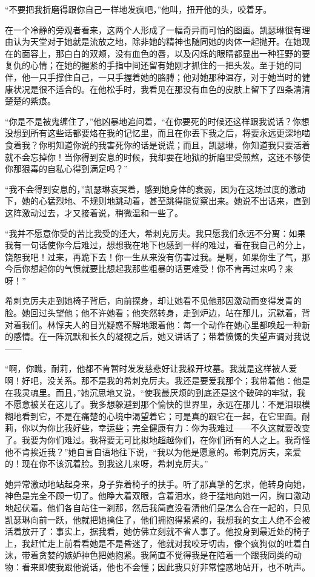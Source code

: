 \par “不要把我折磨得跟你自己一样地发疯吧，”他叫，扭开他的头，咬着牙。
\par 在一个冷静的旁观者看来，这两个人形成了一幅奇异而可怕的图画。凯瑟琳很有理由认为天堂对于她就是流放之地，除非她的精神也随同她的肉体一起抛开。在她现在的面容上，那白白的双颊，没有血色的唇，以及闪烁的眼睛都显出一种狂野的要复仇的心情；在她的握紧的手指中间还留有她刚才抓住的一把头发。至于她的同伴，他一只手撑住自己，一只手握着她的胳膊；他对她那种温存，对于她当时的健康状况是很不适合的。在他松手时，我看见在那没有血色的皮肤上留下了四条清清楚楚的紫痕。
\par “你是不是被鬼缠住了，”他凶暴地追问着，“在你要死的时候还这样跟我说话？你想没想到所有这些话都要烙在我的记忆里，而且在你丢下我之后，将要永远更深地啮食着我？你明知道你说的我害死你的话是说谎；而且，凯瑟琳，你知道我只要活着就不会忘掉你！当你得到安息的时候，我却要在地狱的折磨里受煎熬，这还不够使你那狠毒的自私心得到满足吗？”
\par “我不会得到安息的，”凯瑟琳哀哭着，感到她身体的衰弱，因为在这场过度的激动下，她的心猛烈地、不规则地跳动着，甚至跳得能觉察出来。她说不出话来，直到这阵激动过去，才又接着说，稍微温和一些了。
\par “我并不愿意你受的苦比我受的还大，希刺克厉夫。我只愿我们永远不分离：如果我有一句话使你今后难过，想想我在地下也感到一样的难过，看在我自己的分上，饶恕我吧！过来，再跪下去！你一生从来没有伤害过我。是啊，如果你生了气，那今后你想起你的气愤就要比想起我那些粗暴的话更难受！你不肯再过来吗？来呀！”
\par 希刺克厉夫走到她椅子背后，向前探身，却让她看不见他那因激动而变得发青的脸。她回过头望他；他不许她看；他突然转身，走到炉边，站在那儿，沉默着，背对着我们。林惇夫人的目光疑惑不解地跟着他：每一个动作在她心里都唤起一种新的感情。在一阵沉默和长久的凝视之后，她又讲话了；带着愤慨的失望声调对我说——
\par “啊，你瞧，耐莉，他都不肯暂时发发慈悲好让我躲开坟墓。我就是这样被人爱啊！好吧，没关系。那不是我的希刺克厉夫。我还是要爱我那个；我带着他：他是在我灵魂里。而且，”她沉思地又说，“使我最厌烦的到底还是这个破碎的牢狱，我不愿意被关在这儿了。我多想躲避到那个愉快的世界里，永远在那儿：不是泪眼模糊地看到它，不是在痛楚的心境中渴望着它；可是真的跟它在一起，在它里面。耐莉，你以为你比我好些，幸运些；完全健康有力：你为我难过——不久这就要改变了。我要为你们难过。我将要无可比拟地超越你们，在你们所有的人之上。我奇怪他不肯挨近我？”她自言自语地往下说，“我以为他是愿意的。希刺克厉夫，亲爱的！现在你不该沉着脸。到我这儿来呀，希刺克厉夫。”
\par 她异常激动地站起身来，身子靠着椅子的扶手。听了那真挚的乞求，他转身向她，神色是完全不顾一切了。他睁大着双眼，含着泪水，终于猛地向她一闪，胸口激动地起伏着。他们各自站住一刹那，然后我简直没看清他们是怎么合在一起的，只见凯瑟琳向前一跃，他就把她擒住了，他们拥抱得紧紧的，我想我的女主人绝不会被活着放开了：事实上，据我看，她仿佛立刻就不省人事了。他投身到最近处的椅子上，我赶忙走上前看看她是不是昏迷了，他就对我咬牙切齿，像个疯狗似的吐着白沫，带着贪婪的嫉妒神色把她抱紧。我简直不觉得我是在陪着一个跟我同类的动物：看来即使我跟他说话，他也不会懂；因此我只好非常惶惑地站开，也不吭声。
